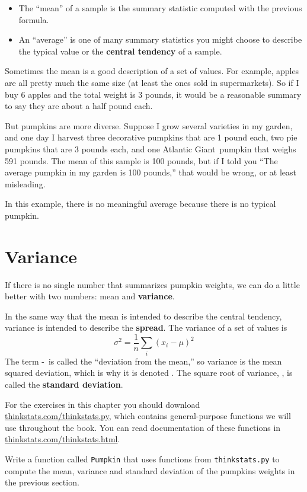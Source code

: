 \documentclass[12pt]{book}
\begin{document}
\begin{itemize}

\item The ``mean'' of a sample is the summary statistic computed with
  the previous formula.

\item An ``average'' is one of many summary statistics you might
  choose to describe the typical value or the
  {\bf central tendency} of a sample.

\end{itemize}

Sometimes the mean is a good description of a set of values.  For
example, apples are all pretty much the same size (at least the ones
sold in supermarkets).  So if I buy 6 apples and the total weight is 3
pounds, it would be a reasonable summary to say they are about a half
pound each.

But pumpkins are more diverse.  Suppose I grow several varieties in my
garden, and one day I harvest three decorative pumpkins that are 1
pound each, two pie pumpkins that are 3 pounds each, and one Atlantic
Giant\textregistered~pumpkin that weighs 591 pounds.  The mean of
this sample is 100 pounds, but if I told you ``The average pumpkin
in my garden is 100 pounds,'' that would be wrong, or at least
misleading.

In this example, there is no meaningful average because
there is no typical pumpkin.

\section{Variance}

If there is no single number that summarizes pumpkin weights,
we can do a little better with two numbers: mean and {\bf variance}.

In the same way that the mean is intended to describe the central
tendency, variance is intended to describe the {\bf spread}.
The variance of a set of values is
%
\[ \sigma^2 = \frac{1}{n} \sum_i (x_i - \mu)^2 \]
%
The term \xsubi-\mymu~is called the ``deviation from the mean,'' so
variance is the mean squared deviation, which is why it is denoted
\sigmasq.  The square root of variance, \mysigma, is called the {\bf
  standard deviation}.

\begin{exercise}
For the exercises in this chapter you should download
\url{thinkstats.com/thinkstats.py}, which contains general-purpose
functions we will use throughout the book.  You can read documentation
of these functions in \url{thinkstats.com/thinkstats.html}.

Write a function called
{\tt Pumpkin} that uses functions from {\tt thinkstats.py} to compute
the mean, variance and standard deviation of the pumpkins weights in
the previous section.
\end{exercise}
\end{document}
